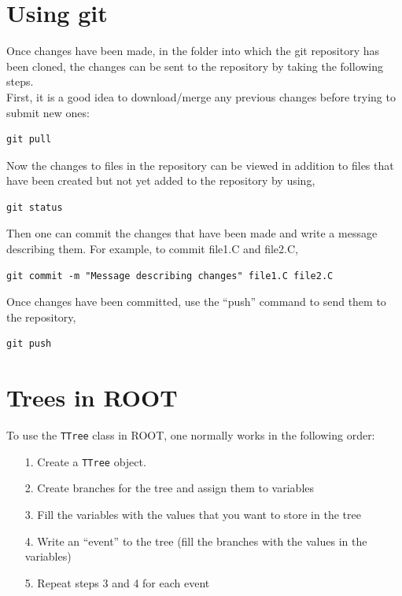 \documentclass[10pt]{article}
\begin{document}
\section{Using git}
\noindent Once changes have been made, in the folder into which the git repository has been cloned, the changes can be sent to the repository by taking the following steps.\\

\noindent First, it is a good idea to download/merge any previous changes before trying to submit new ones:

\begin{verbatim}
git pull
\end{verbatim}

\noindent Now the changes to files in the repository can be viewed in addition to files that have been created but not yet added to the repository by using,

\begin{verbatim}
git status
\end{verbatim}

\noindent Then one can commit the changes that have been made and write a message describing them.  For example, to commit file1.C and file2.C,

\begin{verbatim}
git commit -m "Message describing changes" file1.C file2.C
\end{verbatim}

\noindent Once changes have been committed, use the ``push'' command to send them to the repository,

\begin{verbatim}
git push
\end{verbatim}

\section{Trees in ROOT}
\noindent To use the \verb|TTree| class in ROOT, one normally works in the following order:

\begin{enumerate}
 \item[1.] Create a \verb|TTree| object.
 \item[2.] Create branches for the tree and assign them to variables
 \item[3.] Fill the variables with the values that you want to store in the tree
 \item[4.] Write an ``event'' to the tree (fill the branches with the values in the variables)
 \item[5.] Repeat steps 3 and 4 for each event
\end{enumerate}
\end{document}
